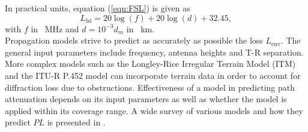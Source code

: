 \documentclass[10pt,journal,twoside]{IEEEtran}
\begin{document}
In practical units, equation (\ref{eqn:FSL}) is given as
\begin{equation}
\label{eqn:FSL2}
L_{\text{fsl}} = 20\log\left( f \right) + 20\log\left( d \right) + 32.45,
\end{equation}
with $f$ in \SI{}{MHz} and $d = 10^{-3}d_m$ in \SI{}{km}.\\
Propagation models strive to predict as accurately as possible the loss $L_{\text{env}}$. The general input parameters include frequency, antenna heights and T-R separation. More complex models such as the Longley-Rice Irregular Terrain Model (ITM) and the ITU-R P.\num{452} model can incorporate terrain data in order to account for diffraction loss due to obstructions. Effectiveness of a model in predicting path attenuation depends on its input parameters as well as whether the model is applied within its coverage range. A wide survey of various models and how they predict $PL$ is presented in \cite{Phillips:Survey}.  %
%
%
\end{document}
